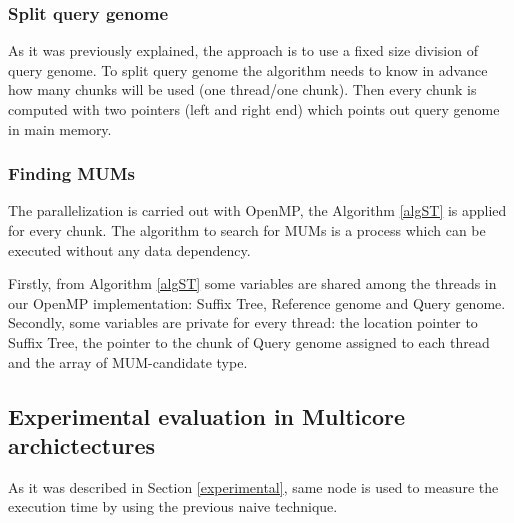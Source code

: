\documentclass[conference]{IEEEtran}
\begin{document}
\subsubsection*{Split query genome}  
As it was previously explained, the approach is to use a fixed size division of query genome. To split query genome the algorithm needs to know in advance how many chunks will be used (one thread/one chunk). Then every chunk is computed with two pointers (left and right end) which points out query genome in main memory.
\subsubsection*{Finding MUMs}
The parallelization is carried out with OpenMP, the Algorithm \ref{algST} is applied for every chunk. The algorithm to search for MUMs is a process which can be executed without any data dependency. 

Firstly, from Algorithm \ref{algST} some variables are shared among the threads in our OpenMP implementation: Suffix Tree, Reference genome and Query genome. Secondly, some variables are private for every thread: the location pointer to Suffix Tree, the pointer to the chunk of Query genome assigned to each thread and the array of MUM-candidate type.

\subsection{Experimental evaluation in Multicore archictectures} 
As it was described in Section \ref{experimental}, same node is used to measure the execution time by using the previous naive technique.
\end{document}
